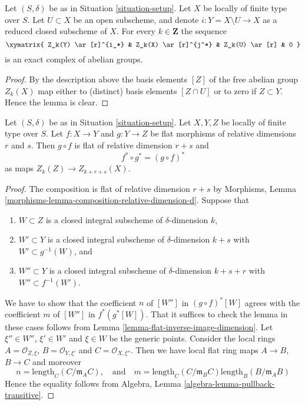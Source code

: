\begin{lemma}
\label{lemma-exact-sequence-open}
Let $(S, \delta)$ be as in Situation \ref{situation-setup}.
Let $X$ be locally of finite type over $S$.
Let $U \subset X$ be an open subscheme, and denote
$i : Y = X \setminus U \to X$ as a reduced closed subscheme of $X$.
For every $k \in \mathbf{Z}$ the sequence
$$
\xymatrix{
Z_k(Y) \ar[r]^{i_*} & Z_k(X) \ar[r]^{j^*} & Z_k(U) \ar[r] & 0
}
$$
is an exact complex of abelian groups.
\end{lemma}

\begin{proof}
By the description above the basis elements $[Z]$ of the free
abelian group $Z_k(X)$ map either to (distinct) basis elements
$[Z \cap U]$ or to zero if $Z \subset Y$. Hence the lemma is clear.
\end{proof}

\begin{lemma}
\label{lemma-compose-flat-pullback}
Let $(S, \delta)$ be as in Situation \ref{situation-setup}.
Let $X, Y, Z$ be locally of finite type over $S$.
Let $f : X \to Y$ and $g : Y \to Z$ be flat morphisms of relative dimensions
$r$ and $s$. Then $g \circ f$ is flat of relative dimension
$r + s$ and
$$
f^* \circ g^* = (g \circ f)^*
$$
as maps $Z_k(Z) \to Z_{k + r + s}(X)$.
\end{lemma}

\begin{proof}
The composition is flat of relative dimension $r + s$ by
Morphisms, Lemma \ref{morphisms-lemma-composition-relative-dimension-d}.
Suppose that
\begin{enumerate}
\item $W \subset Z$ is a closed integral subscheme of $\delta$-dimension $k$,
\item $W' \subset Y$ is a closed integral subscheme of $\delta$-dimension
$k + s$ with $W' \subset g^{-1}(W)$, and
\item $W'' \subset Y$ is a closed integral subscheme of $\delta$-dimension
$k + s + r$ with $W'' \subset f^{-1}(W')$.
\end{enumerate}
We have to show that the coefficient $n$ of $[W'']$ in
$(g \circ f)^*[W]$ agrees with the coefficient $m$ of
$[W'']$ in $f^*(g^*[W])$. That it suffices to check the lemma in these
cases follows from Lemma \ref{lemma-flat-inverse-image-dimension}.
Let $\xi'' \in W''$, $\xi' \in W'$
and $\xi \in W$ be the generic points. Consider the local rings
$A = \mathcal{O}_{Z, \xi}$, $B = \mathcal{O}_{Y, \xi'}$
and $C = \mathcal{O}_{X, \xi''}$. Then we have local flat ring maps
$A \to B$, $B \to C$ and moreover
$$
n = \text{length}_C(C/\mathfrak m_AC),
\quad
\text{and}
\quad
m = \text{length}_C(C/\mathfrak m_BC) \text{length}_B(B/\mathfrak m_AB)
$$
Hence the equality follows from
Algebra, Lemma \ref{algebra-lemma-pullback-transitive}.
\end{proof}

